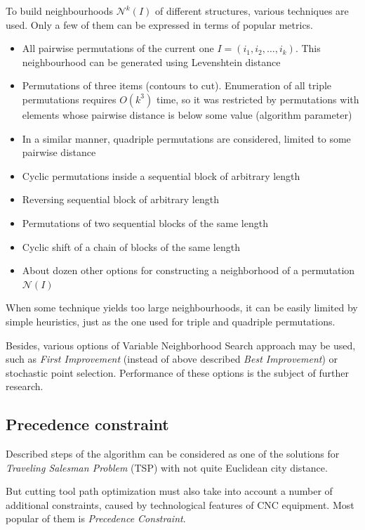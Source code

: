 \documentclass{ifacconf}
\begin{document}
To build neighbourhoods
$\mathcal N^k(I)$
of different structures,
various techniques are used.
Only a few of them
can be expressed in terms of
popular metrics.

\begin{itemize}
\item All pairwise permutations of the current one
$I=(i_1, i_2, \dots, i_k)$.
This neighbourhood can be
generated using Levenshtein distance

\item Permutations of three items (contours to cut).
Enumeration of all triple permutations
requires $O(k^3)$ time,
so it was restricted
by permutations with elements
whose pairwise distance is below
some value
(algorithm parameter)

\item In a similar manner,
quadriple permutations are considered,
limited to some pairwise distance

\item Cyclic permutations inside a sequential block of arbitrary length
\item Reversing sequential block of arbitrary length
\item Permutations of two sequential blocks of the same length
\item Cyclic shift of a chain of blocks of the same length
\item About dozen other options for constructing a neighborhood of a permutation $ \mathcal N (I) $
\end{itemize}

When some technique yields
too large neighbourhoods,
it can be easily limited
by simple heuristics,
just as the one used for
triple and quadriple permutations.

Besides,
various options of
Variable Neighborhood Search approach
may be used,
such as
\textit{First Improvement}
(instead of above described \textit{Best Improvement})
or
stochastic point selection.
Performance of these options
is the subject of further research.

\subsection{Precedence constraint}

Described steps of the algorithm
can be considered as one of the solutions
for
\textit{Traveling Salesman Problem}
(TSP)
with not quite Euclidean city distance.

But cutting tool path optimization
must also take into account a number of
additional constraints,
caused by technological features
of CNC equipment.
Most popular of them is
\textit{Precedence Constraint}.
\end{document}
